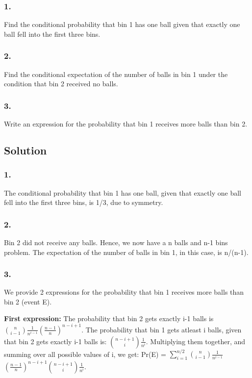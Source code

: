 \documentclass[10pt]{article}
\begin{document}
\subsubsection{1.}
Find the conditional probability that bin 1 has one ball given that exactly one ball fell into the first three bins.
\subsubsection{2.}
Find the conditional expectation of the number of balls in bin 1 under the condition that bin 2 received no balls.
\subsubsection{3.}
Write an expression for the probability that bin 1 receives more balls than bin 2.

\subsection{Solution}
\subsubsection{1.}
The conditional probability that bin 1 has one ball, given that exactly one ball fell into the first three bins, is 1/3, due to symmetry.

\subsubsection{2.}
Bin 2 did not receive any balls. Hence, we now have a n balls and n-1 bins problem. The expectation of the number of balls in bin 1, in this case, is n/(n-1).

\subsubsection{3.}
We provide 2 expressions for the probability that bin 1 receives more balls than bin 2 (event E).

\textbf{First expression:} The probability that bin 2 gets exactly i-1 balls is $\binom{n}{i-1}\frac{1}{n^{i-1}}(\frac{n-1}{n})^{n-i+1}$. The probability that bin 1 gets atleast i balls, given that bin 2 gets exactly i-1 balls is: $\binom{n-i+1}{i}\frac{1}{n^{i}}$. Multiplying them together, and summing over all possible values of i, we get: Pr(E) = $\sum_{i=1}^{n/2}\binom{n}{i-1}\frac{1}{n^{i-1}}$ $(\frac{n-1}{n})^{n-i+1}\binom{n-i+1}{i}\frac{1}{n^{i}}$.
\end{document}
